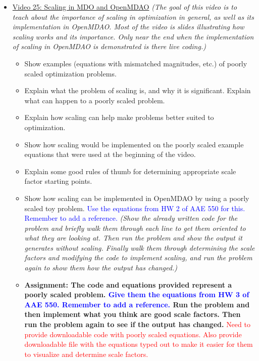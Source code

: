 \documentclass[12pt, letterpaper]{article}
\begin{document}
\begin{itemize}
	\item \underline{Video 25: Scaling in MDO and OpenMDAO} \textit{(The goal of this video is to teach about the importance of scaling in optimization in general, as well as its implementation in OpenMDAO. Most of the video is slides illustrating how scaling works and its importance. Only near the end when the implementation of scaling in OpenMDAO is demonstrated is there live coding.)}
		\begin{itemize}
			\item Show examples (equations with mismatched magnitudes, etc.) of poorly scaled optimization problems.
			\item Explain what the problem of scaling is, and why it is significant. Explain what can happen to a poorly scaled problem.
			\item Explain how scaling can help make problems better suited to optimization.
			\item Show how scaling would be implemented on the poorly scaled example equations that were used at the beginning of the video.
			\item Explain some good rules of thumb for determining appropriate scale factor starting points.
			\item Show how scaling can be implemented in OpenMDAO by using a poorly scaled toy problem. \textcolor{blue}{Use the equations from HW 2 of AAE 550 for this. Remember to add a reference.} \textit{(Show the already written code for the problem and briefly walk them through each line to get them oriented to what they are looking at. Then run the problem and show the output it generates without scaling. Finally walk them through determining the scale factors and modifying the code to implement scaling, and run the problem again to show them how the output has changed.)}
			\item \textbf{Assignment: The code and equations provided represent a poorly scaled problem. \textcolor{blue}{Give them the equations from HW 3 of AAE 550. Remember to add a reference.} Run the problem and then implement what you think are good scale factors. Then run the problem again to see if the output has changed.} \textcolor{red}{Need to provide downloadable code with poorly scaled equations. Also provide downloadable file with the equations typed out to make it easier for them to visualize and determine scale factors.}
		\end{itemize}
		

\end{itemize}
\end{document}
